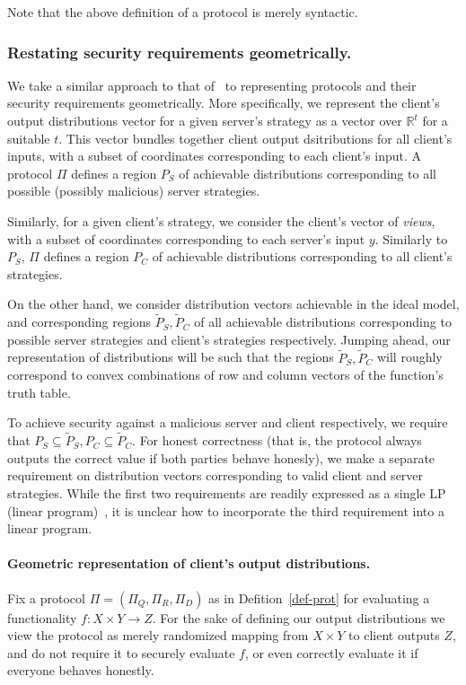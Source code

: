 \documentclass[a4paper]{article}
\newcommand{\R}{\mathbb{R}}
\begin{document}
Note that the above definition of a protocol is merely syntactic.
\subsubsection{Restating security requirements geometrically.}
We take a similar approach to that of~\cite{Ash14}
to representing protocols and their security requirements geometrically.
More specifically, we represent the client's output distributions vector for a given server's strategy as a vector over $\R^t$ for a suitable $t$. This vector bundles together client output dsitributions for all client's inputs, with a subset of coordinates corresponding to each client's input. A protocol $\Pi$ defines a region $P_S$ of achievable distributions corresponding to all possible (possibly malicious) server strategies.

Similarly, for a given client's strategy, we consider the client's vector of \emph{views}, with a subset of coordinates corresponding to each server's input $y$.  Similarly to $P_S$, $\Pi$ defines a region $P_C$ of achievable distributions corresponding to all client's strategies. 

On the other hand, we consider distribution vectors achievable 
in the ideal model, and corresponding regions $\tilde{P}_S,\tilde{P}_C$ of all achievable distributions corresponding to possible server strategies and client's strategies respectively.
Jumping ahead, our representation of distributions will be such that the regions $\tilde{P}_S,\tilde{P}_C$ will roughly correspond to convex combinations of row and column vectors of the function's truth table.

To achieve security against a malicious server and client respectively, we require that $P_S\subseteq \tilde{P}_S, P_C\subseteq \tilde{P}_C$.
For honest correctness (that is, the protocol always outputs the correct value if both parties behave honesly), we make a separate requirement on distribution vectors corresponding to valid client and server strategies. While the first two requirements are readily expressed as a single LP (linear program)~\cite{}, it is unclear how to incorporate the third requirement into a linear program. 


\paragraph{Geometric representation of client's output distributions.}
Fix a protocol $\Pi=(\Pi_Q,\Pi_R,\Pi_D)$
as in Defition~\ref{def-prot} for evaluating a functionality $f:X\times Y\rightarrow Z$. For the sake of defining our output distributions we view the protocol as merely randomized mapping from $X\times Y$ to client outputs $Z$, and do not require it to securely evaluate $f$, or even correctly evaluate it if everyone behaves honestly.
\end{document}
